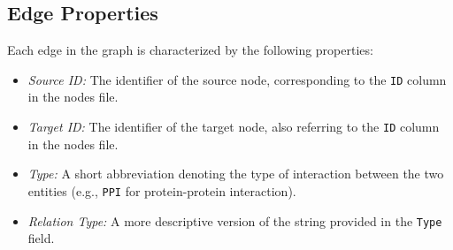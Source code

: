 \subsection*{Edge Properties}
Each edge in the graph is characterized by the following properties:
\begin{itemize}
    \item \emph{Source ID:} The identifier of the source node, corresponding to the \texttt{ID} column in the nodes file.
    \item \emph{Target ID:} The identifier of the target node, also referring to the \texttt{ID} column in the nodes file.
    \item \emph{Type:} A short abbreviation denoting the type of interaction between the two entities (e.g., \texttt{PPI} for protein-protein interaction).
    \item \emph{Relation Type:} A more descriptive version of the string provided in the \texttt{Type} field.
\end{itemize}